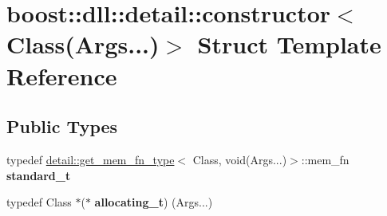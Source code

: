 \hypertarget{a01356}{}\section{boost\+:\+:dll\+:\+:detail\+:\+:constructor$<$ Class(Args...)$>$ Struct Template Reference}
\label{a01356}
\subsection*{Public Types}
\begin{DoxyCompactItemize}
\item 
\mbox{\label{a01356_ab765d8c7c083efce92a933c806a41e81}} 
typedef \hyperlink{a01412}{detail\+::get\+\_\+mem\+\_\+fn\+\_\+type}$<$ Class, void(Args...)$>$\+::mem\+\_\+fn {\bfseries standard\+\_\+t}
\item 
\mbox{\label{a01356_a19159ea77e5c102bd216195b32045677}} 
typedef Class $\ast$($\ast$ {\bfseries allocating\+\_\+t}) (Args...)
\end{DoxyCompactItemize}
